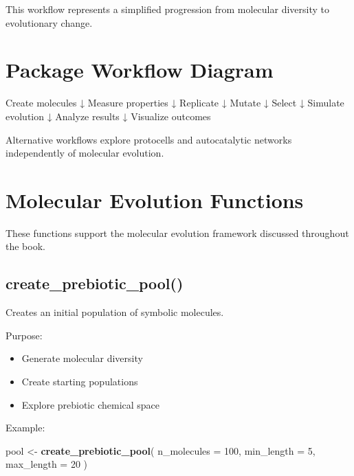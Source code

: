 \documentclass[
  oneside,
  openany]{book}
\newenvironment{Shaded}{\begin{snugshade}}{\end{snugshade}}
\newcommand{\AttributeTok}[1]{\textcolor[rgb]{0.13,0.29,0.53}{#1}}
\newcommand{\DecValTok}[1]{\textcolor[rgb]{0.00,0.00,0.81}{#1}}
\newcommand{\FunctionTok}[1]{\textcolor[rgb]{0.13,0.29,0.53}{\textbf{#1}}}
\newcommand{\NormalTok}[1]{#1}
\newcommand{\OtherTok}[1]{\textcolor[rgb]{0.56,0.35,0.01}{#1}}
\providecommand{\tightlist}{%
  \setlength{\itemsep}{0pt}\setlength{\parskip}{0pt}}
\begin{document}
This workflow represents a simplified progression from molecular diversity to evolutionary change.

\section{Package Workflow Diagram}\label{package-workflow-diagram}

\begin{Shaded}
\begin{Highlighting}[]
\NormalTok{Create molecules}
\NormalTok{        ↓}
\NormalTok{Measure properties}
\NormalTok{        ↓}
\NormalTok{Replicate}
\NormalTok{        ↓}
\NormalTok{Mutate}
\NormalTok{        ↓}
\NormalTok{Select}
\NormalTok{        ↓}
\NormalTok{Simulate evolution}
\NormalTok{        ↓}
\NormalTok{Analyze results}
\NormalTok{        ↓}
\NormalTok{Visualize outcomes}
\end{Highlighting}
\end{Shaded}

Alternative workflows explore protocells and autocatalytic networks independently of molecular evolution.

\section{Molecular Evolution Functions}\label{molecular-evolution-functions}

These functions support the molecular evolution framework discussed throughout the book.

\subsection{create\_prebiotic\_pool()}\label{create_prebiotic_pool}

Creates an initial population of symbolic molecules.

Purpose:

\begin{itemize}
\tightlist
\item
  Generate molecular diversity
\item
  Create starting populations
\item
  Explore prebiotic chemical space
\end{itemize}

Example:

\begin{Shaded}
\begin{Highlighting}[]
\NormalTok{pool }\OtherTok{\textless{}{-}} \FunctionTok{create\_prebiotic\_pool}\NormalTok{(}
  \AttributeTok{n\_molecules =} \DecValTok{100}\NormalTok{,}
  \AttributeTok{min\_length =} \DecValTok{5}\NormalTok{,}
  \AttributeTok{max\_length =} \DecValTok{20}
\NormalTok{)}
\end{Highlighting}
\end{Shaded}
\end{document}
